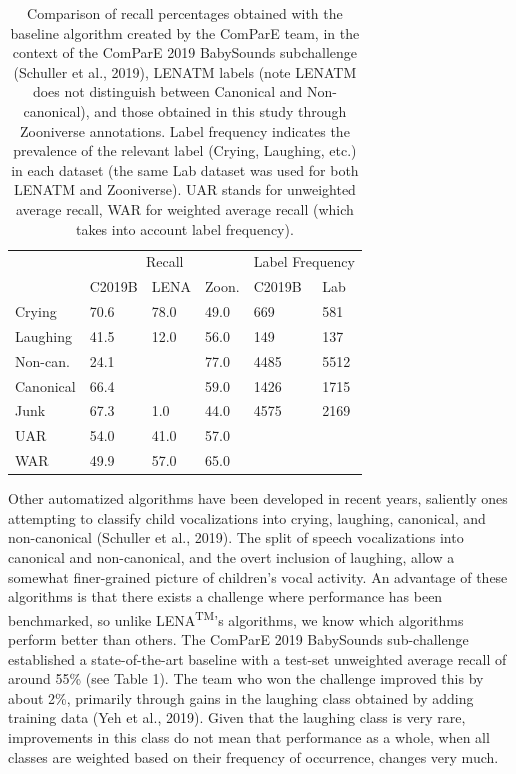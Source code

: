 \documentclass[english,,man,floatsintext]{apa6}
\begin{document}
\begin{table}

\caption{\label{tab:tab-LENA-challenge}Comparison of recall percentages obtained with the baseline algorithm created by the ComParE team, in the context of the ComParE 2019 BabySounds subchallenge (Schuller et al., 2019), LENATM labels (note LENATM does not distinguish between Canonical and Non-canonical), and those obtained in this study through Zooniverse annotations. Label frequency indicates the prevalence of the relevant label (Crying, Laughing, etc.) in each dataset (the same Lab dataset was used for both LENATM and Zooniverse). UAR stands for unweighted average recall, WAR for weighted average recall (which takes into account label frequency).}
\centering
\begin{tabular}[t]{l|l|l|l|l|l}
\hline
\multicolumn{1}{c|}{ } & \multicolumn{3}{c|}{Recall} & \multicolumn{2}{c}{Label Frequency} \\
\cline{2-4} \cline{5-6}
 & C2019B & LENA & Zoon. & C2019B & Lab\\
\hline
Crying & 70.6 & 78.0 & 49.0 & 669 & 581\\
\cline{1-6}
Laughing & 41.5 & 12.0 & 56.0 & 149 & 137\\
\cline{1-6}
Non-can. & 24.1 &  & 77.0 & 4485 & 5512\\
\cline{1-2}
\cline{4-6}
Canonical & 66.4 & \multirow{-2}{*}{\raggedright\arraybackslash 73.0} & 59.0 & 1426 & 1715\\
\cline{1-6}
Junk & 67.3 & 1.0 & 44.0 & 4575 & 2169\\
\cline{1-6}
UAR & 54.0 & 41.0 & 57.0 &  & \\
\cline{1-4}
WAR & 49.9 & 57.0 & 65.0 & \multirow{-2}{*}{\raggedright\arraybackslash } & \multirow{-2}{*}{\raggedright\arraybackslash }\\
\hline
\end{tabular}
\end{table}

Other automatized algorithms have been developed in recent years, saliently ones attempting to classify child vocalizations into crying, laughing, canonical, and non-canonical (Schuller et al., 2019). The split of speech vocalizations into canonical and non-canonical, and the overt inclusion of laughing, allow a somewhat finer-grained picture of children's vocal activity. An advantage of these algorithms is that there exists a challenge where performance has been benchmarked, so unlike LENA\textsuperscript{TM}'s algorithms, we know which algorithms perform better than others. The ComParE 2019 BabySounds sub-challenge established a state-of-the-art baseline with a test-set unweighted average recall of around 55\% (see Table 1). The team who won the challenge improved this by about 2\%, primarily through gains in the laughing class obtained by adding training data (Yeh et al., 2019). Given that the laughing class is very rare, improvements in this class do not mean that performance as a whole, when all classes are weighted based on their frequency of occurrence, changes very much.
\end{document}
